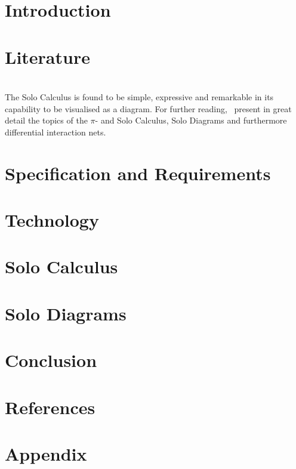 \documentclass{article}
\begin{document}
    \tableofcontents
    \pagebreak


    \section{Introduction}
        

    \section{Literature}
        
        
        
        
        
        
        ~\\ %
        The Solo Calculus is found to be simple, expressive and remarkable in its capability to be visualised as a diagram.
        For further reading,~\cite{acyclic-solos} present in great detail the topics of the $\pi$- and Solo Calculus, Solo Diagrams and furthermore differential interaction nets.

    \section{Specification and Requirements}
        
        

    \section{Technology}

    \section{Solo Calculus}
        
        

    \section{Solo Diagrams}
        
        
        

    \section{Conclusion}

    \section{References}
        

    \section{Appendix}
        
\end{document}

